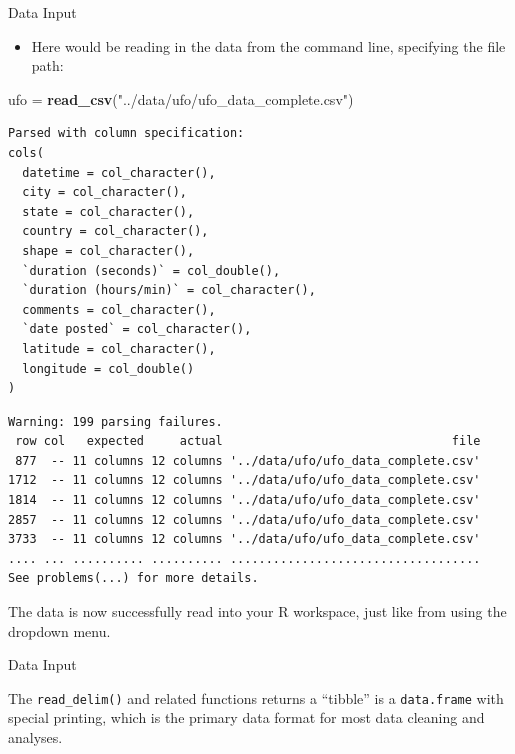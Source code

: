 \documentclass[
  ignorenonframetext,
]{beamer}
\newenvironment{Shaded}{\begin{snugshade}}{\end{snugshade}}
\newcommand{\KeywordTok}[1]{\textcolor[rgb]{0.13,0.29,0.53}{\textbf{#1}}}
\newcommand{\NormalTok}[1]{#1}
\newcommand{\StringTok}[1]{\textcolor[rgb]{0.31,0.60,0.02}{#1}}
\providecommand{\tightlist}{%
  \setlength{\itemsep}{0pt}\setlength{\parskip}{0pt}}
\begin{document}
\begin{frame}[fragile]{Data Input}
\protect\hypertarget{data-input-8}{}

\begin{itemize}
\tightlist
\item
  Here would be reading in the data from the command line, specifying
  the file path:
\end{itemize}

\begin{Shaded}
\begin{Highlighting}[]
\NormalTok{ufo =}\StringTok{ }\KeywordTok{read_csv}\NormalTok{(}\StringTok{"../data/ufo/ufo_data_complete.csv"}\NormalTok{)}
\end{Highlighting}
\end{Shaded}

\begin{verbatim}
Parsed with column specification:
cols(
  datetime = col_character(),
  city = col_character(),
  state = col_character(),
  country = col_character(),
  shape = col_character(),
  `duration (seconds)` = col_double(),
  `duration (hours/min)` = col_character(),
  comments = col_character(),
  `date posted` = col_character(),
  latitude = col_character(),
  longitude = col_double()
)
\end{verbatim}

\begin{verbatim}
Warning: 199 parsing failures.
 row col   expected     actual                                file
 877  -- 11 columns 12 columns '../data/ufo/ufo_data_complete.csv'
1712  -- 11 columns 12 columns '../data/ufo/ufo_data_complete.csv'
1814  -- 11 columns 12 columns '../data/ufo/ufo_data_complete.csv'
2857  -- 11 columns 12 columns '../data/ufo/ufo_data_complete.csv'
3733  -- 11 columns 12 columns '../data/ufo/ufo_data_complete.csv'
.... ... .......... .......... ...................................
See problems(...) for more details.
\end{verbatim}

The data is now successfully read into your R workspace, just like from
using the dropdown menu.

\end{frame}

\begin{frame}[fragile]{Data Input}
\protect\hypertarget{data-input-9}{}

The \texttt{read\_delim()} and related functions returns a ``tibble'' is
a \texttt{data.frame} with special printing, which is the primary data
format for most data cleaning and analyses.

\end{frame}
\end{document}
